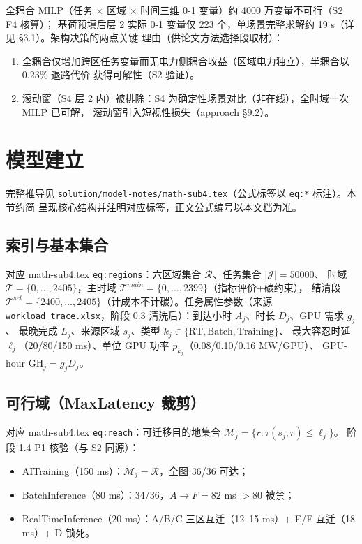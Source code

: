 \documentclass{internal-report}
\begin{document}
全耦合 MILP（任务 $\times$ 区域 $\times$ 时间三维 0-1 变量）约 4000 万变量不可行（S2 F4 核算）；
基荷预填后层 2 实际 0-1 变量仅 223 个，单场景完整求解约 19 s（详见 §3.1）。架构决策的两点关键
理由（供论文方法选择段取材）：
\begin{enumerate}
  \item 全耦合仅增加跨区任务变量而无电力侧耦合收益（区域电力独立），半耦合以 0.23\% 退路代价
        获得可解性（S2 验证）。
  \item 滚动窗（S4 层 2 内）被排除：S4 为确定性场景对比（非在线），全时域一次 MILP 已可解，
        滚动窗引入短视性损失（approach §9.2）。
\end{enumerate}

\section{模型建立}
\label{sec:model}

完整推导见 \texttt{solution/model-notes/math-sub4.tex}（公式标签以 \texttt{eq:*} 标注）。本节约简
呈现核心结构并注明对应标签，正文公式编号以本文档为准。

\subsection{索引与基本集合}
\label{sec:sets}

对应 math-sub4.tex \texttt{eq:regions}：六区域集合 $\mathcal{R}$、任务集合 $|\mathcal{J}|=50000$、
时域 $\mathcal{T}=\{0,\ldots,2405\}$，主时域 $\mathcal{T}^{main}=\{0,\ldots,2399\}$（指标评价+碳约束），
结清段 $\mathcal{T}^{set}=\{2400,\ldots,2405\}$（计成本不计碳）。任务属性参数（来源
\texttt{workload\_trace.xlsx}，阶段 0.3 清洗后）：到达小时 $A_j$、时长 $D_j$、GPU 需求 $g_j$、
最晚完成 $L_j$、来源区域 $s_j$、类型 $k_j\in\{\text{RT},\text{Batch},\text{Training}\}$、
最大容忍时延 $\ell_j$（20/80/150 ms）、单位 GPU 功率 $p_{k_j}$（0.08/0.10/0.16 MW/GPU）、
GPU-hour $\text{GH}_j=g_jD_j$。

\subsection{可行域（MaxLatency 裁剪）}
\label{sec:reach}

对应 math-sub4.tex \texttt{eq:reach}：可迁移目的地集合 $\mathcal{M}_j=\{r:\tau(s_j,r)\le\ell_j\}$。
阶段 1.4 P1 核验（与 S2 同源）：
\begin{itemize}
  \item AITraining（150 ms）：$\mathcal{M}_j=\mathcal{R}$，全图 36/36 可达；
  \item BatchInference（80 ms）：34/36，$A\to F=82$ ms $>80$ 被禁；
  \item RealTimeInference（20 ms）：A/B/C 三区互迁（12--15 ms）+ E/F 互迁（18 ms）+ D 锁死。
\end{itemize}
\end{document}
